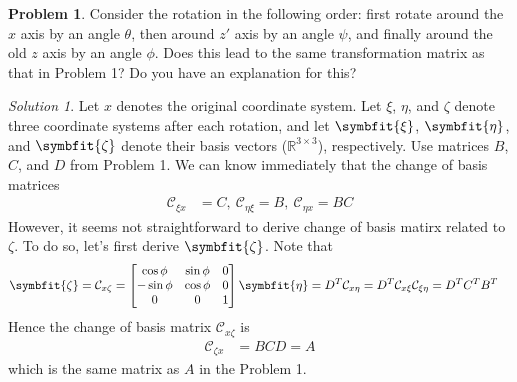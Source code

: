 \documentclass[twoside,11pt]{article}
\newcommand{\lms}{\fontfamily{lmss}\selectfont} %
\theoremstyle{definition}
\newtheorem{problem}{\lms Problem}
\theoremstyle{remark}
\newtheorem*{solution}{Solution}
\begin{document}
\begin{problem}
Consider the rotation in the following order: first rotate around the $x$ axis
by an angle $\theta$, then around $z'$ axis by an angle $\psi$, and finally
around the old $z$ axis by an angle $\phi$.
Does this lead to the same transformation matrix as that in Problem 1?
Do you have an explanation for this?
\end{problem}
\begin{solution} 
Let $x$ denotes the original coordinate system. 
Let $\xi$, $\eta$, and $\zeta$ denote three coordinate systems after each rotation,
and let $\symbfit{\xi}$, $\symbfit{\eta}$, and $\symbfit{\zeta}$ denote their basis
vectors ($\mathbb{R}^{3\times 3}$), respectively.
Use matrices $B$, $C$, and $D$ from Problem 1.
We can know immediately that the change of basis matrices
\begin{align*}
    \mathcal{C}_{\xi x} &= C,~
    \mathcal{C}_{\eta\xi} = B,~
    \mathcal{C}_{\eta x} = BC
\end{align*}
However, it seems not straightforward to derive change of basis matirx related
to $\zeta$.
To do so, let's first derive $\symbfit{\zeta}$.
Note that
\begin{align*}
    \symbfit{\zeta} &= \mathcal{C}_{x\zeta}
    = \begin{bmatrix}
        \cos\phi  & \sin\phi & 0 \\
        -\sin\phi & \cos\phi & 0 \\
        0 & 0 & 1
    \end{bmatrix}\symbfit{\eta}
    = D^T
    \mathcal{C}_{x\eta}
    = D^T
    \mathcal{C}_{x\xi}
    \mathcal{C}_{\xi\eta}
    = D^T C^T B^T
\end{align*}
Hence the change of basis matrix $\mathcal{C}_{x\zeta}$ is
\begin{align*}
    \mathcal{C}_{\zeta x} &= BCD = A
\end{align*}
which is the same matrix as $A$ in the Problem 1.
\end{solution}
\end{document}
